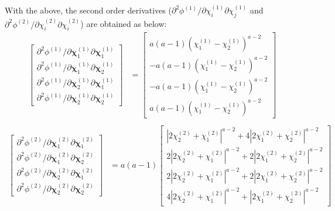\documentclass[12pt]{amsart}
\begin{document}
With the above, the second order derivatives ($\partial^2\phi^{(1)}/\partial\chi^{(1)}_i\partial\chi^{(1)}_j$ and $\partial^2\phi^{(2)}/\partial\chi^{(2)}_i\partial\chi^{(2)}_i$) are obtained as below:
\begin{equation}
  \label{eq:derivative_2_3}
  \begin{split}
    \begin{bmatrix}
      \partial^2\phi^{(1)}/\partial\mathbf{\chi}^{(1)}_1\partial\mathbf{\chi}^{(1)}_1\\
      \partial^2\phi^{(1)}/\partial\mathbf{\chi}^{(1)}_1\partial\mathbf{\chi}^{(1)}_2\\
      \partial^2\phi^{(1)}/\partial\mathbf{\chi}^{(1)}_2\partial\mathbf{\chi}^{(1)}_1\\
      \partial^2\phi^{(1)}/\partial\mathbf{\chi}^{(1)}_2\partial\mathbf{\chi}^{(1)}_2
    \end{bmatrix}
    &=
    \begin{bmatrix}
      a(a-1)(\chi^{(1)}_1-\chi^{(1)}_2)^{a-2}\\
      -a(a-1)(\chi^{(1)}_1-\chi^{(1)}_2)^{a-2}\\
      -a(a-1)(\chi^{(1)}_1-\chi^{(1)}_2)^{a-2}\\
      a(a-1)(\chi^{(1)}_1-\chi^{(1)}_2)^{a-2}
    \end{bmatrix}\\
  \end{split}
\end{equation}
\begin{equation}
  \label{eq:derivative_2_4}
  \begin{split}
    \begin{bmatrix}
      \partial^2\phi^{(2)}/\partial\mathbf{\chi}^{(2)}_1\partial\mathbf{\chi}^{(2)}_1\\
      \partial^2\phi^{(2)}/\partial\mathbf{\chi}^{(2)}_1\partial\mathbf{\chi}^{(2)}_2\\
      \partial^2\phi^{(2)}/\partial\mathbf{\chi}^{(2)}_2\partial\mathbf{\chi}^{(2)}_1\\
      \partial^2\phi^{(2)}/\partial\mathbf{\chi}^{(2)}_2\partial\mathbf{\chi}^{(2)}_2
    \end{bmatrix}
    &=a(a-1)
    \begin{bmatrix}
      |2\chi^{(2)}_2+\chi^{(2)}_1|^{a-2}+4|2\chi^{(2)}_1+\chi^{(2)}_2|^{a-2}\\
      2|2\chi^{(2)}_2+\chi^{(2)}_1|^{a-2}+2|2\chi^{(2)}_1+\chi^{(2)}_2|^{a-2}\\
      2|2\chi^{(2)}_2+\chi^{(2)}_1|^{a-2}+2|2\chi^{(2)}_1+\chi^{(2)}_2|^{a-2}\\
      4|2\chi^{(2)}_2+\chi^{(2)}_1|^{a-2}+|2\chi^{(2)}_1+\chi^{(2)}_2|^{a-2}
    \end{bmatrix}
  \end{split}
\end{equation}
\newline
\end{document}
